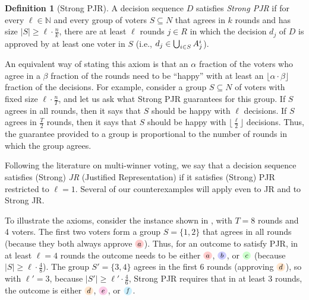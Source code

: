 \documentclass[10pt]{scrartcl}
\theoremstyle{plain}
\theoremstyle{definition}
\newtheorem{definition}[theorem]{Definition}
\renewcommand*{\ge}{\geqslant}
\renewcommand*{\geq}{\geqslant}
\newcommand{\alternativea}{\tikz[baseline=-3pt,transform shape,scale=0.85]{\node[text height=6pt,inner sep=1pt,fill=red!20,    circle,minimum width=12pt] (x) {$a$};}}
\newcommand{\alternativeb}{\tikz[baseline=-3pt,transform shape,scale=0.85]{\node[text height=6pt,inner sep=1pt,fill=blue!20,   circle,minimum width=12pt] (x) {$b$};}}
\newcommand{\alternativec}{\tikz[baseline=-3pt,transform shape,scale=0.85]{\node[text height=6pt,inner sep=1pt,fill=green!20,  circle,minimum width=12pt] (x) {$c$};}}
\newcommand{\alternatived}{\tikz[baseline=-3pt,transform shape,scale=0.85]{\node[text height=6pt,inner sep=1pt,fill=orange!20, circle,minimum width=12pt] (x) {$d$};}}
\newcommand{\alternativee}{\tikz[baseline=-3pt,transform shape,scale=0.85]{\node[text height=6pt,inner sep=1pt,fill=magenta!20,circle,minimum width=12pt] (x) {$e$};}}
\newcommand{\alternativef}{\tikz[baseline=-3pt,transform shape,scale=0.85]{\node[text height=6pt,inner sep=1pt,fill=cyan!20,   circle,minimum width=12pt,font=\small] (x) {$f$};}}
\begin{document}
\begin{definition}[Strong PJR]
    \label{def:strongPJR}
    A decision sequence $D$ satisfies \emph{Strong PJR} if for every $\ell \in \mathbb N$ and every group of voters $S \subseteq N$ that agrees in $k$ rounds and has size $|S| \geq \ell \cdot \frac{n}{k}$, there are at least $\ell$ rounds $j \in R$ in which the decision $d_j$ of $D$ is approved by at least one voter in $S$ (i.e., $d_j \in \bigcup_{i \in S} \smash{A_j^i}$).
\end{definition}

An equivalent way of stating this axiom is that an $\alpha$ fraction of the voters who agree in a $\beta$ fraction of the rounds need to be ``happy'' with at least an $\lfloor \alpha \cdot \beta \rfloor$ fraction of the decisions. For example, consider a group $S\subseteq N$ of voters with fixed size $\ell \cdot \frac{n}{T}$, and let us ask what Strong PJR guarantees for this group. If $S$ agrees in all rounds, then it says that $S$ should be happy with $\ell$ decisions. If $S$ agrees in $\frac{T}{2}$ rounds, then it says that $S$ should be happy with $\lfloor \frac{\ell}{2}\rfloor$ decisions. Thus, the guarantee provided to a group is proportional to the number of rounds in which the group agrees.

Following the literature on multi-winner voting, we say that a decision sequence satisfies (Strong) \emph{JR} (Justified Representation) if it satisfies (Strong) PJR restricted to $\ell = 1$. Several of our counterexamples will apply even to JR and to Strong JR.

To illustrate the axioms, consider the instance shown in , with $T = 8$ rounds and 4 voters. The first two voters form a group $S = \{1,2\}$ that agrees in all rounds (because they both always approve $\alternativea$). Thus, for an outcome to satisfy PJR, in at least $\ell = 4$ rounds the outcome needs to be either $\alternativea$, $\alternativeb$, or $\alternativec$ (because $|S| \ge \ell \cdot \frac48$). The group $S' = \{3, 4\}$ agrees in the first 6 rounds (approving $\alternatived$), so with $\ell' = 3$, because $|S'| \ge \ell' \cdot \frac{4}{6}$, Strong PJR requires that in at least $3$ rounds, the outcome is either $\alternatived$, $\alternativee$, or $\alternativef$.
\end{document}
